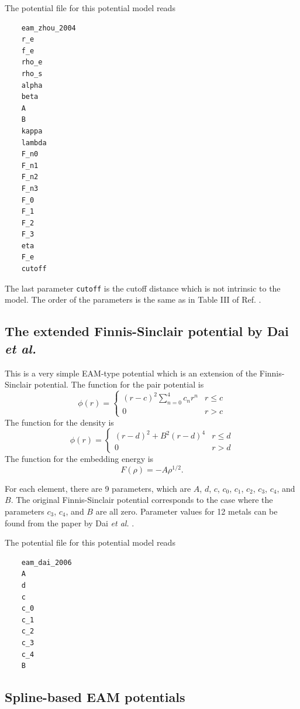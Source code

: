 \documentclass[12pt,a4paper]{report}
\begin{document}
The potential file for this potential model reads
\begin{verbatim}
    eam_zhou_2004
    r_e
    f_e
    rho_e
    rho_s
    alpha
    beta
    A
    B
    kappa
    lambda
    F_n0
    F_n1
    F_n2
    F_n3
    F_0
    F_1
    F_2
    F_3
    eta
    F_e
    cutoff
\end{verbatim}
The last parameter \verb"cutoff" is the cutoff distance which is not intrinsic to the model. The order of the parameters is the same as in Table III of Ref. \cite{zhou2004prb}.

\subsection{The extended Finnis-Sinclair potential by Dai \textit{et al.}}

This is a very simple EAM-type potential which is an extension of the Finnis-Sinclair potential. The function for the pair potential is
\begin{equation}
\phi(r) =
\begin{cases}
(r-c)^2 \sum_{n=0}^4 c_n r^n  & r \leq c \\
0                             & r > c
\end{cases}
\end{equation}
The function for the density is
\begin{equation}
\phi(r) =
\begin{cases}
(r-d)^2 + B^2 (r-d)^4  & r \leq d \\
0                      & r > d
\end{cases}
\end{equation}
The function for the embedding energy is
\begin{equation}
F(\rho) = - A \rho^{1/2}.
\end{equation}

For each element, there are 9 parameters, which are $A$, $d$, $c$, $c_0$, $c_1$, $c_2$, $c_3$, $c_4$, and $B$. The original Finnis-Sinclair potential corresponds to the case where the parameters $c_3$, $c_4$, and $B$ are all zero. Parameter values for 12 metals can be found from the paper by Dai \textit{et al.} \cite{dai2006jpcm}.


The potential file for this potential model reads
\begin{verbatim}
    eam_dai_2006
    A
    d
    c
    c_0
    c_1
    c_2
    c_3
    c_4
    B
\end{verbatim}


\subsection{Spline-based EAM potentials}
\end{document}
